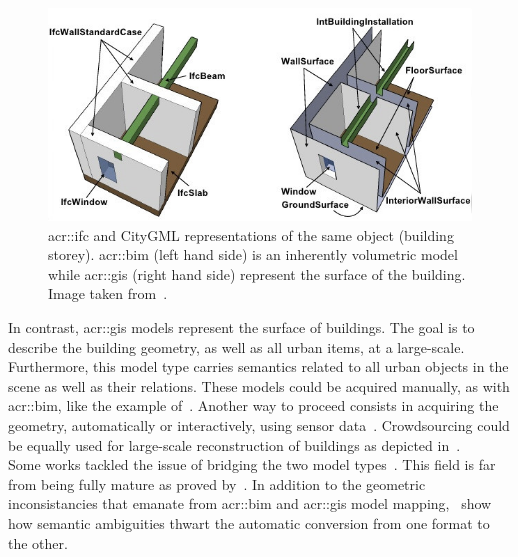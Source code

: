             \begin{figure}[htb]
                \centering
                \includegraphics[width=\textwidth]{images/introduction/bim_vs_gis}            
                \caption[
                    \acrshort*{acr::ifc} and CityGML representations of the same object (building storey).
                ]{
                    \label{fig::bim_vs_gis}
                    \gls{acr::ifc} and CityGML representations of the same object (building storey).
                    \gls{acr::bim} (left hand side) is an inherently volumetric model while \gls{acr::gis} (right hand side) represent the surface of the building.
                    Image taken from~\parencite{nagel2009conceptual}.
                }
            \end{figure}

            In contrast, \gls{acr::gis} models represent the surface of buildings.
            The goal is to describe the building geometry, as well as all urban items, at a large-scale.
            Furthermore, this model type carries semantics related to all urban objects in the scene as well as their relations.
            These models could be acquired manually, as with \gls{acr::bim}, like the example of~\textcite{ref3dnat}.
            Another way to proceed consists in acquiring the geometry, automatically or interactively, using sensor data~\parencite{musialski2013survey}.
            Crowdsourcing could be equally used for large-scale reconstruction of buildings as depicted in~\parencite{uden2013open}.\\

            Some works tackled the issue of bridging the two model types~\parencite{deng2016mapping}.
            This field is far from being fully mature as proved by~\textcite{stoter2018geo}.
            In addition to the geometric inconsistancies that emanate from \gls{acr::bim} and \gls{acr::gis} model mapping,~\textcite{stoter2018geo} show how semantic ambiguities thwart the automatic conversion from one format to the other.\\

